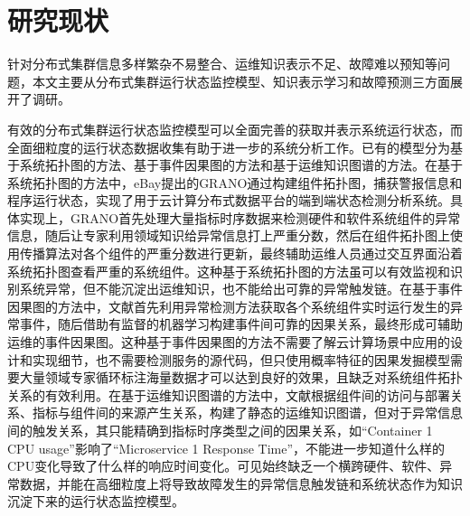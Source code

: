 \section{研究现状}
针对分布式集群信息多样繁杂不易整合、运维知识表示不足、故障难以预知等问题，本文主要从分布式集群运行状态监控模型、知识表示学习和故障预测三方面展开了调研。

有效的分布式集群运行状态监控模型可以全面完善的获取并表示系统运行状态，而全面细粒度的运行状态数据收集有助于进一步的系统分析工作。已有的模型分为基于系统拓扑图的方法、基于事件因果图的方法和基于运维知识图谱的方法。在基于系统拓扑图的方法中，eBay提出的GRANO\cite{wang2019grano}通过构建组件拓扑图，捕获警报信息和程序运行状态，实现了用于云计算分布式数据平台的端到端状态检测分析系统。具体实现上，GRANO首先处理大量指标时序数据来检测硬件和软件系统组件的异常信息，随后让专家利用领域知识给异常信息打上严重分数，然后在组件拓扑图上使用传播算法对各个组件的严重分数进行更新，最终辅助运维人员通过交互界面沿着系统拓扑图查看严重的系统组件。这种基于系统拓扑图的方法虽可以有效监视和识别系统异常，但不能沉淀出运维知识，也不能给出可靠的异常触发链。在基于事件因果图的方法中，文献\parencite{nie2016mining-causality-graph}首先利用异常检测方法\cite{nguyen2011pal}获取各个系统组件实时运行发生的异常事件，随后借助有监督的机器学习\cite{breiman2001randomforest}构建事件间可靠的因果关系，最终形成可辅助运维的事件因果图。这种基于事件因果图的方法不需要了解云计算场景中应用的设计和实现细节，也不需要检测服务的源代码，但只使用概率特征的因果发掘模型需要大量领域专家循环标注海量数据才可以达到良好的效果，且缺乏对系统组件拓扑关系的有效利用。在基于运维知识图谱的方法中，文献\parencite{qiu2020causality-mining-knowledge-graph}根据组件间的访问与部署关系、指标与组件间的来源产生关系，构建了静态的运维知识图谱，但对于异常信息间的触发关系，其只能精确到指标时序类型之间的因果关系，如“Container 1 CPU usage”影响了“Microservice 1 Response Time”\cite{qiu2020causality-mining-knowledge-graph}，不能进一步知道什么样的CPU变化导致了什么样的响应时间变化。可见始终缺乏一个横跨硬件、软件、异常数据，并能在高细粒度上将导致故障发生的异常信息触发链和系统状态作为知识沉淀下来的运行状态监控模型。

